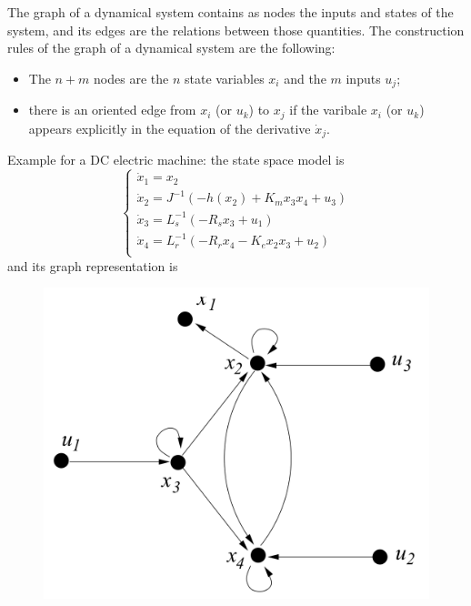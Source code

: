 \documentclass[12pt, openany]{report}
\theoremstyle{definition}
\begin{document}
The graph of a dynamical system contains as nodes the inputs and states of the system, and its edges are the relations between those quantities. The construction rules of the graph of a dynamical system are the following:
\begin{itemize}
    \item The \(n+m\) nodes are the \(n\) state variables \(x_i\) and the \(m\) inputs \(u_j\);
    \item there is an oriented edge from \(x_i\) (or \(u_k\)) to \(x_j\) if the varibale \(x_i\) (or \(u_k\)) appears explicitly in the equation of the derivative \(\dot x_j\).
\end{itemize}
Example for a DC electric machine: the state space model is 
\begin{equation}
    \begin{cases}
        \dot x_1 = x_2\\
        \dot x_2 = J^{-1}(-h(x_2)+K_mx_3x_4+u_3)\\
        \dot x_3 = L_s^{-1}(-R_sx_3+u_1)\\
        \dot x_4 = L_r^{-1}(-R_rx_4-K_ex_2x_3+u_2)\\
    \end{cases}
\end{equation}
and its graph representation is 
\begin{figure}[H]
    \centering
    \includegraphics[width = .5\textwidth]{img/graph.png}
\end{figure}
\end{document}

